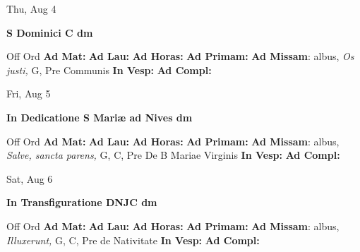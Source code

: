 \documentclass[10pt]{memoir}
\begin{document}
\begin{center}
\begin{minipage}{3.5in}
\vspace{2em}
\begin{center}Thu, Aug 4
\end{center}
\textbf{ \large S Dominici C
\textnormal{\normalsize dm}}

\begin{justify}Off Ord
\textbf{Ad Mat: }
\textbf{Ad Lau: }
\textbf{Ad Horas: }
\textbf{Ad Primam: }\textbf{Ad Missam}: albus, \textit{Os justi,} G, Pre Communis
\textbf{In Vesp: }
\textbf{Ad Compl: }
\end{justify}
\end{minipage}
\end{center}

\begin{center}
\begin{minipage}{3.5in}
\vspace{2em}
\begin{center}Fri, Aug 5
\end{center}
\textbf{ \large In Dedicatione S Mariæ ad Nives
\textnormal{\normalsize dm}}

\begin{justify}Off Ord
\textbf{Ad Mat: }
\textbf{Ad Lau: }
\textbf{Ad Horas: }
\textbf{Ad Primam: }\textbf{Ad Missam}: albus, \textit{Salve, sancta parens,} G, C, Pre De B Mariae Virginis
\textbf{In Vesp: }
\textbf{Ad Compl: }
\end{justify}
\end{minipage}
\end{center}

\begin{center}
\begin{minipage}{3.5in}
\vspace{2em}
\begin{center}Sat, Aug 6
\end{center}
\textbf{ \large In Transfiguratione DNJC
\textnormal{\normalsize dm}}

\begin{justify}Off Ord
\textbf{Ad Mat: }
\textbf{Ad Lau: }
\textbf{Ad Horas: }
\textbf{Ad Primam: }\textbf{Ad Missam}: albus, \textit{Illuxerunt,} G, C, Pre de Nativitate
\textbf{In Vesp: }
\textbf{Ad Compl: }
\end{justify}
\end{minipage}
\end{center}
\end{document}
